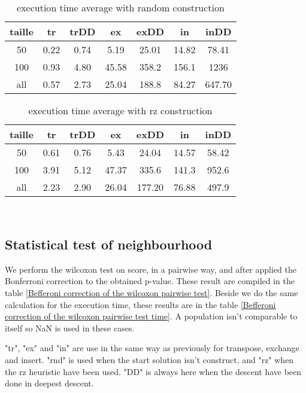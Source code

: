 \documentclass[12pt,a4paper]{article}
\begin{document}
\begin{table}[!h]
\centering
\begin{tabular}{|*{7}{c|}}
  \hline
  taille & tr & trDD & ex & exDD & in & inDD \\
  \hline
  50 & 0.22 & 0.74 & 5.19 & 25.01 & 14.82 & 78.41 \\ 
  100 & 0.93 & 4.80 & 45.58 & 358.2 & 156.1 & 1236 \\
  all & 0.57 & 2.73 & 25.04 & 188.8 & 84.27 & 647.70 \\
  \hline
\end{tabular}
\caption{execution time average with random construction}
\label{Execution time with random construction}
\end{table}

\begin{table}[!h]
\centering
\begin{tabular}{|*{7}{c|}}
  \hline
  taille & tr & trDD & ex & exDD & in & inDD \\
  \hline
  50 & 0.61 & 0.76 & 5.43 & 24.04 & 14.57 & 58.42 \\ 
  100 & 3.91 & 5.12 & 47.37 & 335.6 & 141.3 & 952.6 \\
  all & 2.23 & 2.90 & 26.04 & 177.20 & 76.88 & 497.9 \\
  \hline
\end{tabular}
\caption{execution time average with rz construction}
\label{Execution time with rz construction}
\end{table}

~\\

\subsection{Statistical test of neighbourhood}

We perform the wilcoxon test on score, in a pairwise way, and after applied the Bonferroni correction to the obtained p-value. These result are compiled in the table \ref{Befferoni correction of the wilcoxon pairwise test}. Beside we do the same calculation for the execution time, these results are in the table \ref{Befferoni correction of the wilcoxon pairwise test time}. A population isn't comparable to itself so NaN is used in these cases.

"tr", "ex" and "in" are use in the same way as previously for transpose, exchange and insert. "rnd" is used when the start solution isn't construct, and "rz" when the rz heuristic have been used. "DD" is always here when the descent have been done in deepest descent.
\end{document}
